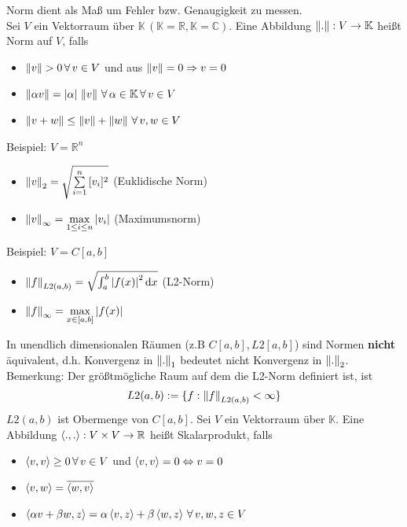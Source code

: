 Norm dient als Maß um Fehler bzw. Genaugigkeit zu messen.\\
 Sei $V$ ein Vektorraum über $\mathbb{K}\,(\mathbb{K}=\mathbb{R}, \mathbb{K}=\mathbb{C})$.
Eine Abbildung $\left\lVert . \right\rVert: V\rightarrow\mathbb{K}$ heißt Norm auf $V$, falls
\begin{itemize}
  \item $\left\lVert v \right\rVert>0\, \forall\, v \in V$ und aus $\left\lVert v \right\rVert=0 \Rightarrow v = 0$
  \item $\left\lVert \alpha v \right\rVert = \left| \alpha \right|\,\left\lVert v \right\rVert\, \forall\, \alpha \in \mathbb{K}\, \forall\, v \in V$
  \item $\left\lVert v+w \right\rVert \leq \left\lVert v \right\rVert + \left\lVert w \right\rVert\, \forall\,v,w\in V$
\end{itemize}
Beispiel: $V=\mathbb{R}^n$\\
\begin{itemize}
  \item $\left\lVert v \right\rVert_2 = \sqrt{\sum\limits_{i=1}^{n}{[v_i]^2}}$ (Euklidische Norm)
  \item $\left\lVert v \right\rVert_{\infty} = \underset{1 \leq i \leq n}{\max} \left| v_i \right|$ (Maximumsnorm)
\end{itemize}
Beispiel: $V=C[a,b]$
\begin{itemize}
  \item $\left\lVert f \right\rVert_{L2(a,b)} = \sqrt{\int_a^b \left| f(x) \right|^2 \mathrm{d}x}$ (L2-Norm)
  \item $\left\lVert f \right\rVert_{\infty} = \underset{x \in [a, b]}{\max} \left| f(x) \right|$
\end{itemize}
In unendlich dimensionalen Räumen (z.B $C[a,b], L2[a,b]$) sind Normen
\large{\textcolor{rot}{\textbf{nicht}}} äquivalent, d.h. Konvergenz 
in $\left\lVert . \right\rVert_1$ bedeutet nicht Konvergenz in $\left\lVert . \right\rVert_2$.\\
Bemerkung: Der größtmögliche Raum auf dem die L2-Norm definiert ist, ist
\begin{align*}
  L2(a,b) := \{f:\left\lVert f \right\rVert_{L2(a,b)} < \infty\}
\end{align*}
$L2(a,b)$ ist Obermenge von $C[a,b]$.
 Sei $V$ ein Vektorraum über $\mathbb{K}$. Eine Abbildung $\left\langle ., . \right\rangle:V \times V \rightarrow \mathbb{R}$
heißt Skalarprodukt, falls
\begin{itemize}
  \item $\left\langle v, v \right\rangle \geq 0\, \forall\, v \in V$ und $\left\langle v, v \right\rangle=0 \Leftrightarrow v=0$
  \item $\left\langle v, w \right\rangle = \overline{\left\langle w, v \right\rangle}$
  \item $\left\langle \alpha v + \beta w, z \right\rangle = \alpha \left\langle v, z \right\rangle + \beta \left\langle w, z \right\rangle \, \forall\,v,w,z\in V$
\end{itemize}
